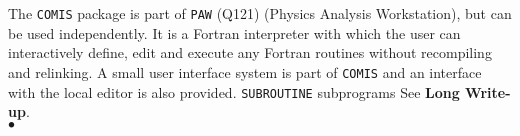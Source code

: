                      
                    
The {\tt COMIS} package is part of {\tt PAW} (Q121) (Physics Analysis
Workstation), but can be used independently. It is a Fortran
interpreter with which the user can interactively define, edit and
execute any Fortran routines without recompiling and relinking. A small
user interface system is part of {\tt COMIS} and an interface with the
local editor is also provided.
\Structure
{\tt SUBROUTINE} subprograms
\Usage
See {\bf Long Write-up}.
\\ $\bullet$
